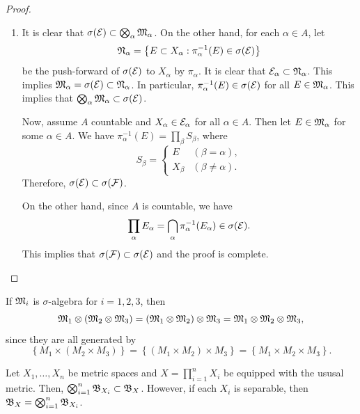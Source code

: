 \documentclass[a4paper]{article}
\begin{document}
{\begin{proof}
\begin{enumerate}
\item It is clear that $\sigma(\mathcal{E}) \subset \bigotimes_\alpha 
\mathfrak{M}_\alpha$. On the other hand, for each $\alpha \in A$, let
\[
  \mathfrak{N}_\alpha = \left\{ E \subset X_\alpha : \pi^{-1}_\alpha 
  (E) \in \sigma(\mathcal{E}) \right\}
\]
be the push-forward 
of $\sigma(\mathcal{E})$ to $X_\alpha$ by $\pi_\alpha$. 
It is clear that $\mathcal{E}_\alpha \subset \mathfrak{N}_\alpha$.
This implies $\mathfrak{M}_\alpha = \sigma(\mathcal{E}) \subset \mathfrak{N}_\alpha$.
In particular, $\pi_\alpha^{-1}(E) \in \sigma(\mathcal{E})$
for all $E \in \mathfrak{M}_\alpha$. This implies that 
$\bigotimes_\alpha \mathfrak{M}_\alpha \subset \sigma(\mathcal{E})$.

Now, assume $A$ countable and $X_\alpha \in \mathcal{E}_\alpha$
for all $\alpha \in A$. Then let $E \in \mathfrak{M}_\alpha$
for some $\alpha \in A$. We have 
$\pi^{-1}_\alpha(E) = \prod_\beta S_\beta$, where 
\[
S_\beta = \begin{cases}
  E & (\beta = \alpha), \\
  X_\beta & (\beta \neq \alpha).
\end{cases}
\]
Therefore, $\sigma(\mathcal{E}) \subset \sigma(\mathcal{F})$. 

On the other hand, since $A$ is countable, we have 
\[
\prod_\alpha E_\alpha = \bigcap_\alpha \pi_\alpha^{-1} 
(E_\alpha) \in \sigma(\mathcal{E}).
\]
This implies that $\sigma(\mathcal{F}) \subset \sigma(\mathcal{E})$
and the proof is complete.

\end{enumerate}
\end{proof}
}

\begin{cor}
  If $\mathfrak{M}_i$ is $\sigma$-algebra for $i = 1, 2, 3$, then 
  \[
  \mathfrak{M}_1 \otimes (\mathfrak{M}_2 \otimes \mathfrak{M}_3) 
  = (\mathfrak{M}_1 \otimes \mathfrak{M}_2) \otimes \mathfrak{M}_3
  = \mathfrak{M}_1 \otimes \mathfrak{M}_2 \otimes \mathfrak{M}_3,
  \]
  since they are all generated by 
  \[
  \left\{ M_1 \times (M_2 \times M_3) \right\}
  = \left\{ (M_1 \times M_2) \times M_3 \right\}
  = \left\{ M_1 \times M_2 \times M_3 \right\}.
  \]
\end{cor}

\begin{thm}
  Let $X_1, \dots, X_n$ be metric spaces and 
  $X = \prod_{i=1}^n X_i$ be equipped with the ususal 
  metric. Then, $\bigotimes_{i=1}^n \mathfrak{B}_{X_i} \subset 
  \mathfrak{B}_X$. However, if each $X_i$ is separable, 
  then $\mathfrak{B}_X = \bigotimes_{i=1}^n \mathfrak{B}_{X_i}$.
\end{thm}
\end{document}
